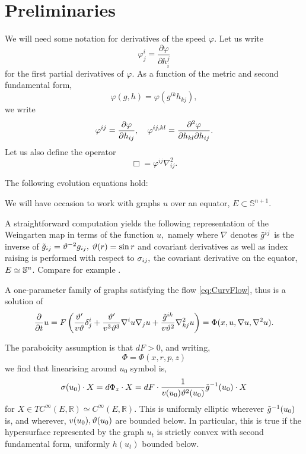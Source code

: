 \documentclass{amsart}
\begin{document}
\section{Preliminaries}
\label{sec:prelim}

We will need some notation for derivatives of the speed \(\varphi\). Let us write
\[
\varphi^{i}_{j} = \frac{\partial \varphi}{\partial h^{j}_{i}}
\]
for the first partial derivatives of \(\varphi\). As a function of the metric and second fundamental form,
\[
\varphi(g, h) = \varphi(g^{ik} h_{kj}),
\]
we write
\[
\varphi^{ij} = \frac{\partial\varphi}{\partial h_{ij}}, \quad \varphi^{ij,kl} = \fr{\partial^2\varphi}{\partial h_{kl} \partial h_{ij}}.
\]
Let us also define the operator
\[
\Box = \varphi^{ij} \nabla^2_{ij}.
\]
\begin{lemma} \label{lem: basi ev}
The following evolution equations hold:
\end{lemma}

We will have occasion to work with graphs \(u\) over an equator, \(E \subset \mathbb{S}^{n+1}\).

A straightforward computation yields the following representation of the Weingarten map in terms of the function $u,$ namely
where \(\nabla\) denotes $\~g^{ij}$ is the inverse of $\~g_{ij}=\vt^{-2}g_{ij},$ $\vt(r)=\sin r$ and covariant derivatives as well as index raising is performed with respect to $\s_{ij},$ the covariant derivative on the equator, \(E \simeq \S^n\). Compare for example \cite[(3.82)]{Scheuer:05/2015}.

A one-parameter family of graphs satisfying the flow \eqref{eq:CurvFlow}, thus is a solution of
\begin{equation}
\label{eq:GraphCurvFlow}
\fr{\del}{\del t}u=F\br{\fr{\vt'}{v\vt}\d^{i}_{j}+\fr{\vt'}{v^{3}\vt^{3}}\nabla^{i}u\nabla_{j}u+\fr{\~g^{ik}}{v\vt^{2}}\nabla^{2}_{kj}u}=\Phi(x,u,\nabla u,\nabla^{2}u).
\end{equation}

The paraboicity assumption is that \(dF > 0\), and writing,
\[
\Phi = \Phi(x, r, p, z)
\]
we find that linearising around \(u_0\) symbol is,
\[
\sigma(u_0) \cdot X = d\Phi_z \cdot X = dF \cdot \fr{1}{v(u_0) \vt^{2}(u_0)} \~g^{-1}(u_0) \cdot X
\]
for \(X \in TC^{\infty}(E, \mathbb{R}) \simeq C^{\infty}(E, \mathbb{R})\). This is uniformly elliptic wherever \(\~g^{-1}(u_0)\) is, and wherever, \(v(u_0), \vt(u_0)\) are bounded below. In particular, this is true if the hypersurface represented by the graph \(u_t\) is strictly convex with second fundamental form, uniformly \(h(u_t)\) bounded below.
\end{document}
